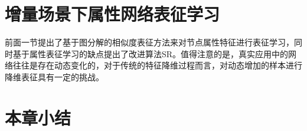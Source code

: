\section{增量场景下属性网络表征学习}
前面一节提出了基于图分解的相似度表征方法来对节点属性特征进行表征学习，同时基于属性表征学习的缺点提出了改进算法SR。值得注意的是，真实应用中的网络往往是存在动态变化的，对于传统的特征降维过程而言，对动态增加的样本进行降维表征具有一定的挑战。





\section{本章小结}
